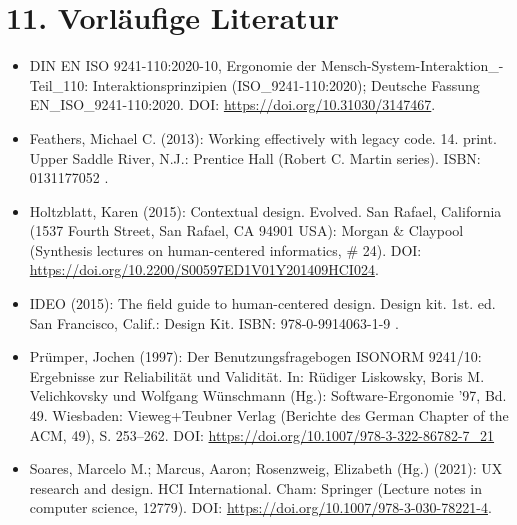 \section*{11. Vorläufige Literatur}
\begin{itemize}
    \item DIN EN ISO 9241-110:2020-10, Ergonomie der Mensch-System-Interaktion\_- Teil\_110: Interaktionsprinzipien (ISO\_9241-110:2020); Deutsche Fassung EN\_ISO\_9241-110:2020. DOI: \url{https://doi.org/10.31030/3147467}.
    
    \item Feathers, Michael C. (2013): Working effectively with legacy code. 14. print. Upper Saddle River, N.J.: Prentice Hall (Robert C. Martin series). ISBN: 0131177052 .
    
    \item Holtzblatt, Karen (2015): Contextual design. Evolved. San Rafael, California (1537 Fourth Street, San Rafael, CA 94901 USA): Morgan \& Claypool (Synthesis lectures on human-centered informatics, \# 24). DOI: \url{https://doi.org/10.2200/S00597ED1V01Y201409HCI024}.
    
    \item IDEO (2015): The field guide to human-centered design. Design kit. 1st. ed. San Francisco, Calif.: Design Kit. ISBN: 978-0-9914063-1-9 .    

    \item Prümper, Jochen (1997): Der Benutzungsfragebogen ISONORM 9241/10: Ergebnisse zur Reliabilität und Validität. In: Rüdiger Liskowsky, Boris M. Velichkovsky und Wolfgang Wünschmann (Hg.): Software-Ergonomie ’97, Bd. 49. Wiesbaden: Vieweg+Teubner Verlag (Berichte des German Chapter of the ACM, 49), S. 253–262.  DOI: \url{https://doi.org/10.1007/978-3-322-86782-7_21}

    \item Soares, Marcelo M.; Marcus, Aaron; Rosenzweig, Elizabeth (Hg.) (2021): UX research and design. HCI International. Cham: Springer (Lecture notes in computer science, 12779). DOI: \url{https://doi.org/10.1007/978-3-030-78221-4}.

\end{itemize}